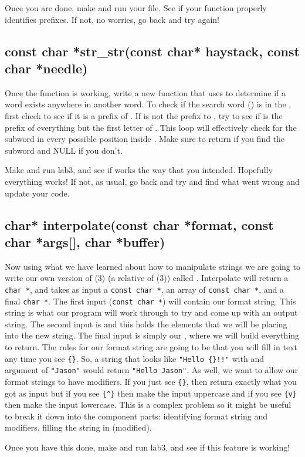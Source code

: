 \documentclass{tufte-handout}
\begin{document}
Once you are done, make and run your file. See if your function properly identifies prefixes. If not, no worries, go back and try again!

\subsection{{const char *str\_str(const char* haystack, const
char *needle)}}

Once the function  is working, write a new
function  that uses  to determine if a word exists anywhere in another word. To check if the search word () is in the , first check to see if it is a prefix of . If  is not the prefix to , try to see if  is the prefix of everything but the first letter of . This loop will effectively check for the subword  in every possible position inside . Make sure to return  if you find the subword and NULL if you don't.

Make and run lab3, and see if  works the way that you intended.  Hopefully everything works!  If not, as usual, go back and try and find what went wrong and update your code.

\subsection{{char* interpolate(const char *format, const char *args[], char *buffer)}}

Now using what we have learned about how to manipulate strings we are
going to write our own version of (3) (a relative
of (3)) called
. Interpolate will return a \verb!char *!, and takes
as input a \verb!const char *!, an array of \verb!const char *!, and
a final \verb!char *!. The
first input (\verb!const char *!)  will contain our format
string. This string is what our program will work through to try and
come up with an output string. The second input is  and
this holds the elements that we will be placing into the new string. The
final input is simply our , where we will build
everything to return. The rules for our format string are going to be
that you will fill in text any time you see \verb!{}!. So, a string that
looks like \verb^"Hello {}!!"^ with and argument of \texttt{"Jason"} would return
\verb!"Hello Jason"!. As well, we want to allow our format strings to have
modifiers. If you just see \verb^{}^, then return exactly what you got as
input but if you see \verb!{^}! then make the input uppercase and if you see
\texttt{\{v\}} then make the input lowercase. This is a complex problem so it might be useful to break it down into the component parts: identifying format string and modifiers, filling the string in (modified).

Once you have this done, make and run lab3, and see if this feature is working!
\end{document}
